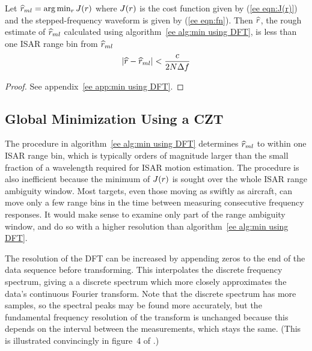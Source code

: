 \begin{theorem}
\label{ee thm:min using DFT}\mbox{}\par

Let $\widehat{r}_{ml}=\arg\min_{{r}}J({r})$ where $J({r})$ is the cost function given by
(\ref{ee eqn:J(r)}) and the stepped-frequency waveform is given by
(\ref{ee eqn:fn}).  Then $\widehat{r}$, the rough estimate of $\widehat{r}_{ml}$ calculated
using algorithm~\ref{ee alg:min using DFT}, is less than one ISAR range bin from
$\widehat{r}_{ml}$
\begin{equation}
\left|\widehat{r}-\widehat{r}_{ml}\right|<\frac{c}{2N\Delta f}
\end{equation}
\end{theorem}

\begin{proof}
See appendix~\ref{ee app:min using DFT}.
\end{proof}

\subsection{Global Minimization Using a CZT}


The procedure in algorithm~\ref{ee alg:min using DFT} determines $\widehat{r}_{ml}$ to
within one ISAR range bin, which is typically orders of magnitude larger
than the small fraction of a wavelength required for ISAR motion
estimation.  The procedure is also inefficient because the minimum of
$J({r})$ is sought over the whole ISAR range ambiguity window.  Most
targets, even those moving as swiftly as aircraft, can move only a few
range bins in the time between measuring consecutive frequency responses. 
It would make sense to examine only part of the range ambiguity window, and
do so with a higher resolution than algorithm~\ref{ee alg:min using DFT}.

The resolution of the DFT can be increased by appending zeros to the end of
the data sequence before transforming.  This interpolates the discrete 
frequency spectrum, giving a a discrete spectrum which more closely
approximates the data's continuous Fourier transform.  Note that the
discrete spectrum has more samples, so the spectral peaks may be found more
accurately, but the fundamental frequency resolution of the transform is
unchanged because this depends on the interval between the measurements,
which stays the same.  (This is illustrated convincingly in figure~4 of 
\cite{Kay81}.)

